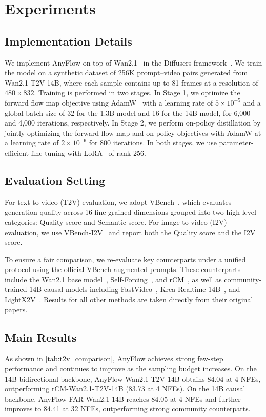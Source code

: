 \section{Experiments}

\subsection{Implementation Details}
We implement AnyFlow on top of Wan2.1~\cite{wan2025wan} in the Diffusers framework~\cite{von-platen-etal-2022-diffusers}. We train the model on a synthetic dataset of 256K prompt--video pairs generated from Wan2.1-T2V-14B, where each sample contains up to 81 frames at a resolution of $480 \times 832$. Training is performed in two stages. In Stage 1, we optimize the forward flow map objective using AdamW~\cite{loshchilov2017decoupled} with a learning rate of $5 \times 10^{-5}$ and a global batch size of 32 for the 1.3B model and 16 for the 14B model, for 6,000 and 4,000 iterations, respectively. In Stage 2, we perform on-policy distillation by jointly optimizing the forward flow map and on-policy objectives with AdamW at a learning rate of $2 \times 10^{-6}$ for 800 iterations. In both stages, we use parameter-efficient fine-tuning with LoRA~\cite{hu2022lora} of rank 256.

\subsection{Evaluation Setting}
For text-to-video (T2V) evaluation, we adopt VBench~\cite{huang2023vbench}, which evaluates generation quality across 16 fine-grained dimensions grouped into two high-level categories: Quality score and Semantic score. For image-to-video (I2V) evaluation, we use VBench-I2V~\cite{huang2025vbench++} and report both the Quality score and the I2V score.

To ensure a fair comparison, we re-evaluate key counterparts under a unified protocol using the official VBench augmented prompts. These counterparts include the Wan2.1 base model~\cite{wan2025wan}, Self-Forcing~\cite{huang2025selfforcing}, and rCM~\cite{zheng2025large}, as well as community-trained 14B causal models including FastVideo~\cite{causalwan2025}, Krea-Realtime-14B~\cite{krea_realtime_14b}, and LightX2V~\cite{lightx2v}. Results for all other methods are taken directly from their original papers.
\subsection{Main Results}
As shown in \cref{tab:t2v_comparison}, AnyFlow achieves strong few-step performance and continues to improve as the sampling budget increases. On the 14B bidirectional backbone, AnyFlow-Wan2.1-T2V-14B obtains 84.04 at 4 NFEs, outperforming rCM-Wan2.1-T2V-14B (83.73 at 4 NFEs). On the 14B causal backbone, AnyFlow-FAR-Wan2.1-14B reaches 84.05 at 4 NFEs and further improves to 84.41 at 32 NFEs, outperforming strong community counterparts.

